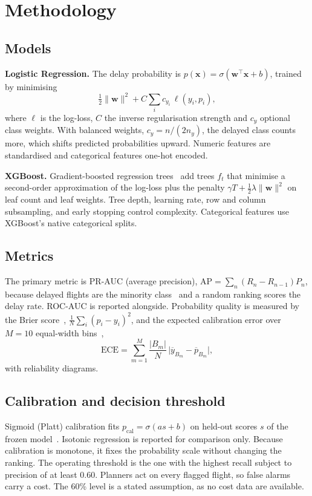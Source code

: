 \section{Methodology}
\label{sec:method}

\subsection{Models}
\textbf{Logistic Regression.} The delay probability is $p(\mathbf{x}) = \sigma(\mathbf{w}^\top
\mathbf{x} + b)$, trained by minimising
\begin{equation}
\tfrac{1}{2}\lVert\mathbf{w}\rVert^2 + C\textstyle\sum_i c_{y_i}\,
\ell(y_i, p_i),
\end{equation}
where $\ell$ is the log-loss, $C$ the inverse regularisation strength and $c_y$ optional class
weights. With balanced weights, $c_y = n/(2n_y)$, the delayed class counts more, which shifts
predicted probabilities upward. Numeric features are standardised and categorical features
one-hot encoded.

\textbf{XGBoost.} Gradient-boosted regression trees~\cite{chen2016xgboost} add trees $f_t$ that
minimise a second-order approximation of the log-loss plus the penalty $\gamma T +
\frac{1}{2}\lambda\lVert\mathbf{w}\rVert^2$ on leaf count and leaf weights. Tree depth, learning
rate, row and column subsampling, and early stopping control complexity. Categorical features use
XGBoost's native categorical splits.

\subsection{Metrics}
The primary metric is PR-AUC (average precision), $\text{AP} = \sum_n (R_n - R_{n-1})P_n$, because
delayed flights are the minority class~\cite{saito2015precision} and a random ranking scores the
delay rate. ROC-AUC is reported alongside. Probability quality is measured by the Brier
score~\cite{brier1950verification}, $\frac{1}{N}\sum_i (p_i - y_i)^2$, and the expected calibration
error over $M = 10$ equal-width
bins~\cite{guo2017calibration},
\begin{equation}
\text{ECE} = \textstyle\sum_{m=1}^{M} \frac{|B_m|}{N}\,\big|\overline{y}_{B_m} -
\overline{p}_{B_m}\big|,
\end{equation}
with reliability diagrams.

\subsection{Calibration and decision threshold}
Sigmoid (Platt) calibration fits $p_{\text{cal}} = \sigma(a s + b)$ on held-out scores $s$ of the
frozen model~\cite{niculescu2005predicting}. Isotonic regression is reported for comparison only. Because calibration is
monotone, it fixes the probability scale without changing the ranking. The operating threshold is
the one with the highest recall subject to precision of at least 0.60. Planners act on every
flagged flight, so false alarms carry a cost. The 60\% level is a stated assumption, as no cost
data are available.

